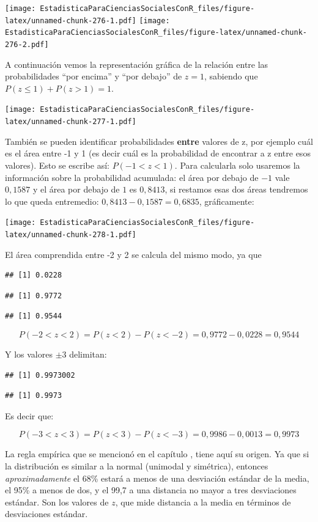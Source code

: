 \documentclass[]{book}
\begin{document}
\texttt{[image: EstadisticaParaCienciasSocialesConR\_files/figure-latex/unnamed-chunk-276-1.pdf]} \texttt{[image: EstadisticaParaCienciasSocialesConR\_files/figure-latex/unnamed-chunk-276-2.pdf]}

A continuación vemos la representación gráfica de la relación entre las
probabilidades ``por encima'' y ``por debajo'' de \(z=1\), sabiendo que \(P(z\leq1)+P(z>1)=1\).

\texttt{[image: EstadisticaParaCienciasSocialesConR\_files/figure-latex/unnamed-chunk-277-1.pdf]}

También se pueden identificar probabilidades \textbf{entre} valores de z, por
ejemplo cuál es el área entre -1 y 1 (es decir cuál es la probabilidad
de encontrar a z entre esos valores). Esto se escribe así:
\(P(-1<z<1)\). Para calcularla solo usaremos la información sobre la
probabilidad acumulada: el área por debajo de \(-1\) vale \(0,1587\) y el área por debajo de \(1\) es \(0,8413\), si restamos esas dos áreas tendremos lo que queda entremedio: \(0,8413 - 0,1587 = 0,6835\), gráficamente:

\texttt{[image: EstadisticaParaCienciasSocialesConR\_files/figure-latex/unnamed-chunk-278-1.pdf]}

El área comprendida entre -2 y 2 se calcula del mismo modo, ya que

\begin{verbatim}
## [1] 0.0228
\end{verbatim}

\begin{verbatim}
## [1] 0.9772
\end{verbatim}

\begin{verbatim}
## [1] 0.9544
\end{verbatim}

\[P(- 2 < z < 2) = P(z < 2) - P(z < - 2) = 0,9772 - 0,0228 = 0,9544\]

Y los valores \(\pm3\) delimitan:

\begin{verbatim}
## [1] 0.9973002
\end{verbatim}

\begin{verbatim}
## [1] 0.9973
\end{verbatim}

Es decir que:

\[P(- 3 < z < 3) = P(z < 3) - P(z < - 3) = 0,9986 - 0,0013 = 0,9973\]

La regla empírica que se mencionó en el capítulo , tiene aquí su origen. Ya que si la distribución es similar a la normal (unimodal y simétrica), entonces \emph{aproximadamente} el 68\% estará a menos de una desviación estándar de la media, el 95\% a menos de dos, y el 99,7 a una distancia no mayor a tres desviaciones estándar. Son los valores de \(z\), que mide distancia a la media en términos de desviaciones estándar.
\end{document}
